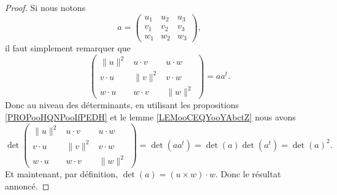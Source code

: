 \begin{proof}
    Si nous notons
    \begin{equation}
        a= \begin{pmatrix}
                u_1 & u_2 & u_3 \\
                v_1 & v_2 & v_3 \\
                w_1 & w_2 & w_3
        \end{pmatrix},
    \end{equation}
    il faut simplement remarquer que
    \begin{equation}
           \begin{pmatrix}
            \| u \|^2   &    u\cdot v   &    u\cdot w     \\
            v\cdot u    &   \| v \|^2   &    v\cdot w     \\
            w\cdot u    &   w\cdot v    &   \| w \|^2
        \end{pmatrix}=aa^t.
    \end{equation}
    Donc au niveau des déterminants, en utilisant les propositions \ref{PROPooHQNPooIfPEDH} et le lemme \ref{LEMooCEQYooYAbctZ} nous avons
    \begin{equation}
           \det\begin{pmatrix}
            \| u \|^2   &    u\cdot v   &    u\cdot w    \\
            v\cdot u    &   \| v \|^2   &    v\cdot w    \\
            w\cdot u    &   w\cdot v    &   \| w \|^2
        \end{pmatrix}=\det(aa^t)=\det(a)\det(a^t)=\det(a)^2.
    \end{equation}
    Et maintenant, par définition, \( \det(a)=(u\times w)\cdot w\). Donc le résultat annoncé.
\end{proof}

